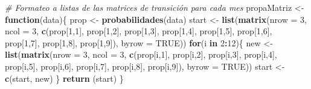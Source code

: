 \documentclass{article}
\newenvironment{Shaded}{\begin{snugshade}}{\end{snugshade}}
\newcommand{\CommentTok}[1]{\textcolor[rgb]{0.56,0.35,0.01}{\textit{#1}}}
\newcommand{\ControlFlowTok}[1]{\textcolor[rgb]{0.13,0.29,0.53}{\textbf{#1}}}
\newcommand{\DataTypeTok}[1]{\textcolor[rgb]{0.13,0.29,0.53}{#1}}
\newcommand{\DecValTok}[1]{\textcolor[rgb]{0.00,0.00,0.81}{#1}}
\newcommand{\KeywordTok}[1]{\textcolor[rgb]{0.13,0.29,0.53}{\textbf{#1}}}
\newcommand{\NormalTok}[1]{#1}
\newcommand{\OperatorTok}[1]{\textcolor[rgb]{0.81,0.36,0.00}{\textbf{#1}}}
\newcommand{\OtherTok}[1]{\textcolor[rgb]{0.56,0.35,0.01}{#1}}
\newcommand{\StringTok}[1]{\textcolor[rgb]{0.31,0.60,0.02}{#1}}
\begin{document}
\begin{Shaded}
\begin{Highlighting}[]
\CommentTok{# Formateo a listas de las matrices de transición para cada mes}
\NormalTok{propaMatriz <-}\StringTok{ }\ControlFlowTok{function}\NormalTok{(data)\{}
\NormalTok{  prop <-}\StringTok{ }\KeywordTok{probabilidades}\NormalTok{(data)}
\NormalTok{  start <-}\StringTok{ }\KeywordTok{list}\NormalTok{(}\KeywordTok{matrix}\NormalTok{(}\DataTypeTok{nrow =} \DecValTok{3}\NormalTok{, }\DataTypeTok{ncol =} \DecValTok{3}\NormalTok{, }\KeywordTok{c}\NormalTok{(prop[}\DecValTok{1}\NormalTok{,}\DecValTok{1}\NormalTok{], prop[}\DecValTok{1}\NormalTok{,}\DecValTok{2}\NormalTok{],}
\NormalTok{                                             prop[}\DecValTok{1}\NormalTok{,}\DecValTok{3}\NormalTok{], prop[}\DecValTok{1}\NormalTok{,}\DecValTok{4}\NormalTok{], }
\NormalTok{                                             prop[}\DecValTok{1}\NormalTok{,}\DecValTok{5}\NormalTok{], prop[}\DecValTok{1}\NormalTok{,}\DecValTok{6}\NormalTok{],}
\NormalTok{                                             prop[}\DecValTok{1}\NormalTok{,}\DecValTok{7}\NormalTok{], prop[}\DecValTok{1}\NormalTok{,}\DecValTok{8}\NormalTok{],}
\NormalTok{                                             prop[}\DecValTok{1}\NormalTok{,}\DecValTok{9}\NormalTok{]), }\DataTypeTok{byrow =} \OtherTok{TRUE}\NormalTok{))}
  \ControlFlowTok{for}\NormalTok{(i }\ControlFlowTok{in} \DecValTok{2}\OperatorTok{:}\DecValTok{12}\NormalTok{)\{}
\NormalTok{    new <-}\KeywordTok{list}\NormalTok{(}\KeywordTok{matrix}\NormalTok{(}\DataTypeTok{nrow =} \DecValTok{3}\NormalTok{, }\DataTypeTok{ncol =} \DecValTok{3}\NormalTok{, }\KeywordTok{c}\NormalTok{(prop[i,}\DecValTok{1}\NormalTok{], prop[i,}\DecValTok{2}\NormalTok{],}
\NormalTok{                                            prop[i,}\DecValTok{3}\NormalTok{], prop[i,}\DecValTok{4}\NormalTok{], }
\NormalTok{                                            prop[i,}\DecValTok{5}\NormalTok{], prop[i,}\DecValTok{6}\NormalTok{],}
\NormalTok{                                            prop[i,}\DecValTok{7}\NormalTok{], prop[i,}\DecValTok{8}\NormalTok{],}
\NormalTok{                                            prop[i,}\DecValTok{9}\NormalTok{]), }\DataTypeTok{byrow =} \OtherTok{TRUE}\NormalTok{))}
\NormalTok{    start <-}\StringTok{ }\KeywordTok{c}\NormalTok{(start, new)}
\NormalTok{  \}}
  \KeywordTok{return}\NormalTok{ (start)}
\NormalTok{\}}
\end{Highlighting}
\end{Shaded}
\end{document}
